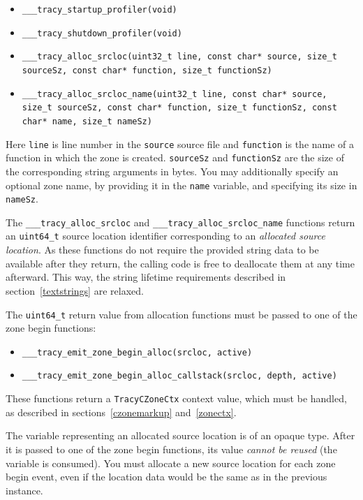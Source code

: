 \documentclass[hidelinks,titlepage,a4paper,twoside]{article}
\begin{document}
\begin{itemize}
\item \texttt{\_\_\_tracy\_startup\_profiler(void)}
\item \texttt{\_\_\_tracy\_shutdown\_profiler(void)}
\item \texttt{\_\_\_tracy\_alloc\_srcloc(uint32\_t line, const char* source, size\_t sourceSz, const char* function, size\_t functionSz)}
\item \texttt{\_\_\_tracy\_alloc\_srcloc\_name(uint32\_t line, const char* source, size\_t sourceSz, const char* function, size\_t functionSz, const char* name, size\_t nameSz)}
\end{itemize}

Here \texttt{line} is line number in the \texttt{source} source file and \texttt{function} is the
name of a function in which the zone is created. \texttt{sourceSz} and \texttt{functionSz} are the
size of the corresponding string arguments in bytes. You may additionally specify an optional zone
name, by providing it in the \texttt{name} variable, and specifying its size in \texttt{nameSz}.

The \texttt{\_\_\_tracy\_alloc\_srcloc} and \texttt{\_\_\_tracy\_alloc\_srcloc\_name} functions
return an \texttt{uint64\_t} source location identifier corresponding to an \emph{allocated source
location}. As these functions do not require the provided string data to be available after they
return, the calling code is free to deallocate them at any time afterward. This way, the string
lifetime requirements described in section~\ref{textstrings} are relaxed.

The \texttt{uint64\_t} return value from allocation functions must be passed to one of the zone
begin functions:

\begin{itemize}
\item \texttt{\_\_\_tracy\_emit\_zone\_begin\_alloc(srcloc, active)}
\item \texttt{\_\_\_tracy\_emit\_zone\_begin\_alloc\_callstack(srcloc, depth, active)}
\end{itemize}


These functions return a \texttt{TracyCZoneCtx} context value, which must be handled, as described
in sections~\ref{czonemarkup} and~\ref{zonectx}.

The variable representing an allocated source location is of an opaque type. After it is passed to one of the zone begin functions, its value \emph{cannot be reused} (the variable is consumed). You must allocate a new source location for each zone begin event, even if the location data would be the same as in the previous instance.
\end{document}
